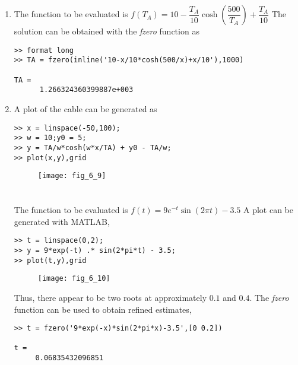 \documentclass[../main.tex]{subfiles}
\begin{document}
\section{}
\begin{enumerate}[label=\bfseries(\alph*)]
\item The function to be evaluated is
\bigbreak
$f\left(T_{A}\right)=10-\dfrac{T_{A}}{10} \cosh \left(\dfrac{500}{T_{A}}\right)+\dfrac{T_{A}}{10}$
\bigbreak
The solution can be obtained with the \textit {fzero} function as
\bigbreak
\begin{lstlisting}[numbers=none]
>> format long
>> TA = fzero(inline('10-x/10*cosh(500/x)+x/10'),1000)

TA =
 	  1.266324360399887e+003
\end{lstlisting}
\bigbreak
\item A plot of the cable can be generated as
\bigbreak
\begin{lstlisting}[numbers=none]
>> x = linspace(-50,100);
>> w = 10;y0 = 5;
>> y = TA/w*cosh(w*x/TA) + y0 - TA/w;
>> plot(x,y),grid 
\end{lstlisting}
\bigbreak
\begin{figure}[H]
		\hspace*{0.8cm}\texttt{[image: fig\_6\_9]}
		\label{fig:fig_6_9}
	\end{figure}
	\bigbreak


\section{}
The function to be evaluated is
\bigbreak
$f(t)=9 e^{-t} \sin (2 \pi t)-3.5$
\bigbreak
A plot can be generated with MATLAB,
\bigbreak
\begin{lstlisting}[numbers=none]
>> t = linspace(0,2);
>> y = 9*exp(-t) .* sin(2*pi*t) - 3.5;
>> plot(t,y),grid 
\end{lstlisting}
\bigbreak
\begin{figure}[H]
		\hspace*{0.8cm}\texttt{[image: fig\_6\_10]}
		\label{fig:fig_6_10}
	\end{figure}
	\bigbreak
	
Thus, there appear to be two roots at approximately $0.1$ and $0.4$. The \textit {fzero} function can be used to obtain refined estimates,
\bigbreak
\begin{lstlisting}[numbers=none]
>> t = fzero('9*exp(-x)*sin(2*pi*x)-3.5',[0 0.2])

t =
 	 0.06835432096851
 	

\end{lstlisting}
\end{enumerate}
\end{document}
